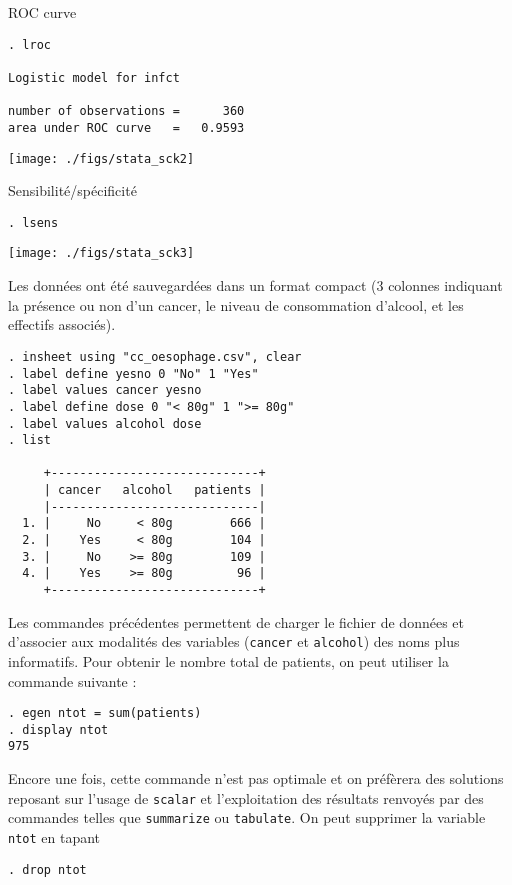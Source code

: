 
ROC curve
\begin{verbatim}
. lroc

Logistic model for infct

number of observations =      360
area under ROC curve   =   0.9593
\end{verbatim}

\texttt{[image: ./figs/stata\_sck2]}

Sensibilité/spécificité
\begin{verbatim}
. lsens
\end{verbatim}

\texttt{[image: ./figs/stata\_sck3]}

% 
%
%
\soln{\ref{exo:10.6}}
Les données ont été sauvegardées dans un format compact (3 colonnes
indiquant la présence ou non d'un cancer, le niveau de consommation
d'alcool, et les effectifs associés).
\begin{verbatim}
. insheet using "cc_oesophage.csv", clear
. label define yesno 0 "No" 1 "Yes" 
. label values cancer yesno 
. label define dose 0 "< 80g" 1 ">= 80g"
. label values alcohol dose
. list

     +-----------------------------+
     | cancer   alcohol   patients |
     |-----------------------------|
  1. |     No     < 80g        666 |
  2. |    Yes     < 80g        104 |
  3. |     No    >= 80g        109 |
  4. |    Yes    >= 80g         96 |
     +-----------------------------+
\end{verbatim}
Les commandes précédentes permettent de charger le fichier de données et
d'associer aux modalités des variables (\texttt{cancer} et \texttt{alcohol})
des noms plus informatifs. Pour obtenir le nombre total de patients, on peut
utiliser la commande suivante :
\begin{verbatim}
. egen ntot = sum(patients)
. display ntot
975
\end{verbatim}
Encore une fois, cette commande n'est pas optimale et on préfèrera des
solutions reposant sur l'usage de \verb|scalar| et l'exploitation des
résultats renvoyés par des commandes telles que \verb|summarize| ou
\verb|tabulate|. On peut supprimer la variable \texttt{ntot} en tapant 
\begin{verbatim}
. drop ntot
\end{verbatim}

